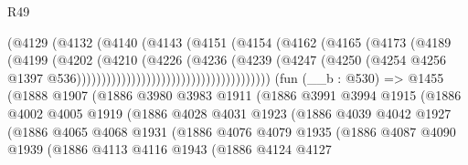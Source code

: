 \begin{lexlean}{R49}
\begin{coremodule}
                                            (@4129
                                              (@4132
                                                (@4140
                                                  (@4143
                                                    (@4151
                                                      (@4154
                                                        (@4162
                                                          (@4165
                                                            (@4173
                                                              (@4189
                                                                (@4199
                                                                  (@4202
                                                                    (@4210
                                                                      (@4226
                                                                        (@4236
                                                                          (@4239
                                                                            (@4247
                                                                              (@4250
                                                                                (@4254
                                                                                  @4256
                                                                                  @1397
                                                                                  @536)))))))))))))))))))))))))))))))))))))))
    (fun (__b : @530) =>
    @1455
      (@1888
        @1907
        (@1886
          @3980
          @3983
          @1911
          (@1886
            @3991
            @3994
            @1915
            (@1886
              @4002
              @4005
              @1919
              (@1886
                @4028
                @4031
                @1923
                (@1886
                  @4039
                  @4042
                  @1927
                  (@1886
                    @4065
                    @4068
                    @1931
                    (@1886
                      @4076
                      @4079
                      @1935
                      (@1886
                        @4087
                        @4090
                        @1939
                        (@1886
                          @4113
                          @4116
                          @1943
                          (@1886
                            @4124
                            @4127

\end{coremodule}
\end{lexlean}

